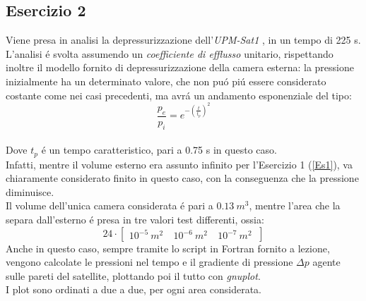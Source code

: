 \documentclass{article}
\begin{document}
        \subsection{Esercizio 2\label{Es2}}

        Viene presa in analisi la depressurizzazione dell'\textit{UPM-Sat1} 
        \autocite*{UPM_sat1}, in un tempo di 225 s. \\ 
        L'analisi é svolta assumendo un \textit{coefficiente di efflusso} unitario,
        rispettando inoltre il modello fornito di depressurizzazione della camera esterna: la pressione
        inizialmente ha un determinato valore, che non puó piú essere considerato costante come nei casi precedenti, ma avrá un andamento 
        esponenziale del tipo: \\
        \begin{equation}
            \frac{p_e}{p_i} = e^{-\left ({\frac{t}{t_p}}  \right )^2}
        \end{equation}
         \label{exp_press}
        \\ 
        Dove $t_p$ é un tempo caratteristico, pari a 0.75 s in questo caso.
        \\ 
        \linebreak
        Infatti, mentre il volume esterno era assunto infinito per l'Esercizio 1 (\ref{Es1}), va chiaramente considerato
        finito in questo caso, con la conseguenza che la pressione diminuisce.
        \\ 
        \linebreak
        Il volume dell'unica camera considerata é pari a $0.13 \ m^3$, mentre 
        l'area che la separa dall'esterno é presa in tre valori test differenti, ossia:
        \[24 \cdot \begin{bmatrix}
            10^{-5}\ m^2\ & 10^{-6}\ m^2\ & 10^{-7} \ m^2\
            \end{bmatrix}\]
        \linebreak
        Anche in questo caso, sempre tramite lo script in Fortran fornito a lezione, 
        vengono calcolate le pressioni nel tempo e il gradiente di pressione $\Delta p$ agente sulle pareti
        del satellite, plottando poi il tutto con \textit{gnuplot}.\\ 
        I plot sono ordinati a due a due, per ogni area considerata.
        \pagebreak
        
\end{document}
